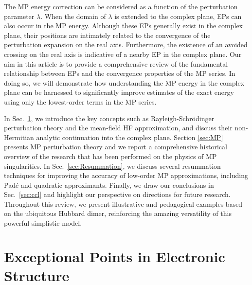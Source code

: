 \documentclass[aps,prb,reprint,noshowkeys,superscriptaddress]{revtex4-1}
\begin{document}
The MP energy correction can be considered as a function of the perturbation parameter $\lambda$.
When the domain of $\lambda$ is extended to the complex plane, EPs can also occur in the MP energy.
Although these EPs generally exist in the complex plane, their positions are intimately related to the 
convergence of the perturbation expansion on the real axis.%
\cite{BenderBook,Olsen_1996,Olsen_2000,Olsen_2019,Mihalka_2017a,Mihalka_2017b,Mihalka_2019}
Furthermore, the existence of an avoided crossing on the real axis is indicative of a nearby EP
in the complex plane.
Our aim in this article is to provide a comprehensive review of the fundamental relationship between EPs
and the convergence properties of the MP series.
In doing so, we will demonstrate how understanding the MP energy in the complex plane can 
be harnessed to significantly improve estimates of the exact energy using only the lowest-order terms
in the MP series.

In Sec.~\ref{sec:EPs}, we introduce the key concepts such as Rayleigh-Schr\"odinger perturbation theory and the mean-field HF approximation, and discuss their non-Hermitian analytic continuation into the complex plane.
Section \ref{sec:MP} presents MP perturbation theory and we report a comprehensive historical overview of the research that
has been performed on the physics of MP singularities.
In Sec.~\ref{sec:Resummation}, we discuss several resummation techniques for improving the accuracy
of low-order MP approximations, including Pad\'e and quadratic approximants.
Finally, we draw our conclusions in Sec.~\ref{sec:ccl} and highlight our perspective on directions for 
future research.
Throughout this review, we present illustrative and pedagogical examples based on the ubiquitous 
Hubbard dimer, reinforcing the amazing versatility of this powerful simplistic model.

\section{Exceptional Points in Electronic Structure}
\label{sec:EPs}

\end{document}
